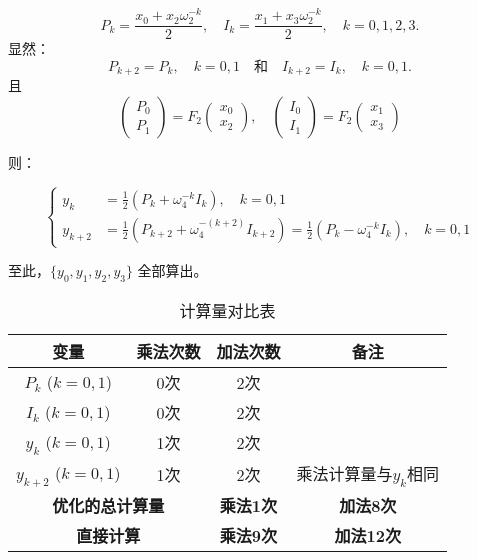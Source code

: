 \documentclass[linespread=1.5,openany]{book}%
\theoremstyle{plain}
\begin{document}
{{{					
					\begin{equation}
						P_k = \frac{x_0 + x_2 \omega_2^{-k}}{2}, \quad I_k = \frac{x_1 + x_3 \omega_2^{-k}}{2}, \quad k = 0, 1, 2, 3.
					\end{equation}
					显然：
					\begin{equation}
						P_{k+2} = P_k, \quad k = 0, 1 \quad \text{和} \quad I_{k+2} = I_k, \quad k = 0, 1.
					\end{equation}
					且
					\begin{equation}
						\begin{pmatrix} P_0 \\ P_1 \end{pmatrix} = F_2 \begin{pmatrix} x_0 \\ x_2 \end{pmatrix}, \quad \begin{pmatrix} I_0 \\ I_1 \end{pmatrix} = F_2 \begin{pmatrix} x_1 \\ x_3 \end{pmatrix}
					\end{equation}
					
					则：
					
					\begin{equation}
						\left\{
						\begin{aligned}
							y_k &= \frac{1}{2} \left( P_k + \omega_4^{-k} I_k \right), \quad k = 0, 1 \\[8pt]
							y_{k+2} &= \frac{1}{2} \left( P_{k+2} + \omega_4^{-(k+2)} I_{k+2} \right) = \frac{1}{2} \left( P_k - \omega_4^{-k} I_k \right), \quad k = 0, 1
						\end{aligned}
						\right.
					\end{equation}
					
					至此，$\{ y_0, y_1, y_2, y_3 \}$ 全部算出。
					
					\begin{table}[h]
						\centering
						\begin{tabular}{cccc}
							\toprule
							\textbf{变量} & \textbf{乘法次数} & \textbf{加法次数} & \textbf{备注} \\
							\midrule
							$P_k$ ($k = 0, 1$) & 0次 & 2次 &  \\
							$I_k$ ($k = 0, 1$) & 0次 & 2次 &  \\
							$y_k$ ($k = 0, 1$) & 1次 & 2次 &  \\
							$y_{k + 2}$ ($k = 0, 1$) & 1次 & 2次 & 乘法计算量与$y_k$相同 \\
							\midrule
							\multicolumn{2}{c}{\textbf{优化的总计算量}} & \textbf{乘法1次} & \textbf{加法8次} \\
							\midrule
							\multicolumn{2}{c}{\textbf{直接计算}} & \textbf{乘法9次} & \textbf{加法12次} \\
							\bottomrule
						\end{tabular}
						\caption{计算量对比表}
					\end{table}
					
}}}
\end{document}
